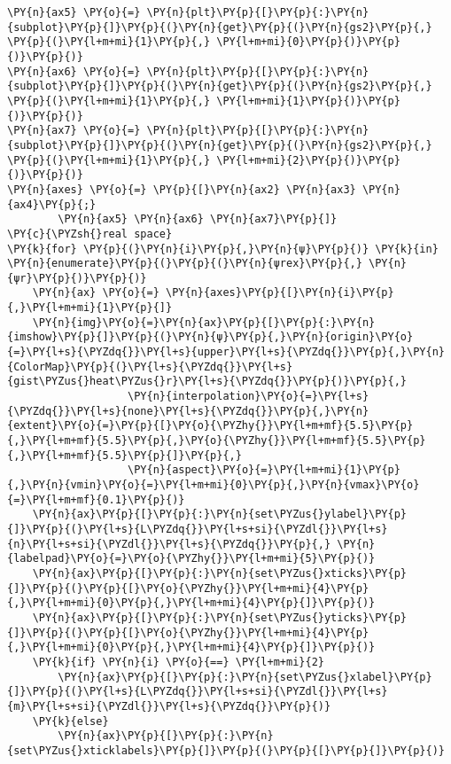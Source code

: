 \begin{Verbatim}[commandchars=\\\{\}]
\PY{n}{ax5} \PY{o}{=} \PY{n}{plt}\PY{p}{[}\PY{p}{:}\PY{n}{subplot}\PY{p}{]}\PY{p}{(}\PY{n}{get}\PY{p}{(}\PY{n}{gs2}\PY{p}{,} \PY{p}{(}\PY{l+m+mi}{1}\PY{p}{,} \PY{l+m+mi}{0}\PY{p}{)}\PY{p}{)}\PY{p}{)}
\PY{n}{ax6} \PY{o}{=} \PY{n}{plt}\PY{p}{[}\PY{p}{:}\PY{n}{subplot}\PY{p}{]}\PY{p}{(}\PY{n}{get}\PY{p}{(}\PY{n}{gs2}\PY{p}{,} \PY{p}{(}\PY{l+m+mi}{1}\PY{p}{,} \PY{l+m+mi}{1}\PY{p}{)}\PY{p}{)}\PY{p}{)}
\PY{n}{ax7} \PY{o}{=} \PY{n}{plt}\PY{p}{[}\PY{p}{:}\PY{n}{subplot}\PY{p}{]}\PY{p}{(}\PY{n}{get}\PY{p}{(}\PY{n}{gs2}\PY{p}{,} \PY{p}{(}\PY{l+m+mi}{1}\PY{p}{,} \PY{l+m+mi}{2}\PY{p}{)}\PY{p}{)}\PY{p}{)}
\PY{n}{axes} \PY{o}{=} \PY{p}{[}\PY{n}{ax2} \PY{n}{ax3} \PY{n}{ax4}\PY{p}{;}
        \PY{n}{ax5} \PY{n}{ax6} \PY{n}{ax7}\PY{p}{]}
\PY{c}{\PYZsh{}real space}
\PY{k}{for} \PY{p}{(}\PY{n}{i}\PY{p}{,}\PY{n}{ψ}\PY{p}{)} \PY{k}{in} \PY{n}{enumerate}\PY{p}{(}\PY{p}{(}\PY{n}{ψrex}\PY{p}{,} \PY{n}{ψr}\PY{p}{)}\PY{p}{)}
    \PY{n}{ax} \PY{o}{=} \PY{n}{axes}\PY{p}{[}\PY{n}{i}\PY{p}{,}\PY{l+m+mi}{1}\PY{p}{]}
    \PY{n}{img}\PY{o}{=}\PY{n}{ax}\PY{p}{[}\PY{p}{:}\PY{n}{imshow}\PY{p}{]}\PY{p}{(}\PY{n}{ψ}\PY{p}{,}\PY{n}{origin}\PY{o}{=}\PY{l+s}{\PYZdq{}}\PY{l+s}{upper}\PY{l+s}{\PYZdq{}}\PY{p}{,}\PY{n}{ColorMap}\PY{p}{(}\PY{l+s}{\PYZdq{}}\PY{l+s}{gist\PYZus{}heat\PYZus{}r}\PY{l+s}{\PYZdq{}}\PY{p}{)}\PY{p}{,}
                   \PY{n}{interpolation}\PY{o}{=}\PY{l+s}{\PYZdq{}}\PY{l+s}{none}\PY{l+s}{\PYZdq{}}\PY{p}{,}\PY{n}{extent}\PY{o}{=}\PY{p}{[}\PY{o}{\PYZhy{}}\PY{l+m+mf}{5.5}\PY{p}{,}\PY{l+m+mf}{5.5}\PY{p}{,}\PY{o}{\PYZhy{}}\PY{l+m+mf}{5.5}\PY{p}{,}\PY{l+m+mf}{5.5}\PY{p}{]}\PY{p}{,}
                   \PY{n}{aspect}\PY{o}{=}\PY{l+m+mi}{1}\PY{p}{,}\PY{n}{vmin}\PY{o}{=}\PY{l+m+mi}{0}\PY{p}{,}\PY{n}{vmax}\PY{o}{=}\PY{l+m+mf}{0.1}\PY{p}{)}
    \PY{n}{ax}\PY{p}{[}\PY{p}{:}\PY{n}{set\PYZus{}ylabel}\PY{p}{]}\PY{p}{(}\PY{l+s}{L\PYZdq{}}\PY{l+s+si}{\PYZdl{}}\PY{l+s}{n}\PY{l+s+si}{\PYZdl{}}\PY{l+s}{\PYZdq{}}\PY{p}{,} \PY{n}{labelpad}\PY{o}{=}\PY{o}{\PYZhy{}}\PY{l+m+mi}{5}\PY{p}{)}
    \PY{n}{ax}\PY{p}{[}\PY{p}{:}\PY{n}{set\PYZus{}xticks}\PY{p}{]}\PY{p}{(}\PY{p}{[}\PY{o}{\PYZhy{}}\PY{l+m+mi}{4}\PY{p}{,}\PY{l+m+mi}{0}\PY{p}{,}\PY{l+m+mi}{4}\PY{p}{]}\PY{p}{)}
    \PY{n}{ax}\PY{p}{[}\PY{p}{:}\PY{n}{set\PYZus{}yticks}\PY{p}{]}\PY{p}{(}\PY{p}{[}\PY{o}{\PYZhy{}}\PY{l+m+mi}{4}\PY{p}{,}\PY{l+m+mi}{0}\PY{p}{,}\PY{l+m+mi}{4}\PY{p}{]}\PY{p}{)}
    \PY{k}{if} \PY{n}{i} \PY{o}{==} \PY{l+m+mi}{2}
        \PY{n}{ax}\PY{p}{[}\PY{p}{:}\PY{n}{set\PYZus{}xlabel}\PY{p}{]}\PY{p}{(}\PY{l+s}{L\PYZdq{}}\PY{l+s+si}{\PYZdl{}}\PY{l+s}{m}\PY{l+s+si}{\PYZdl{}}\PY{l+s}{\PYZdq{}}\PY{p}{)}
    \PY{k}{else}
        \PY{n}{ax}\PY{p}{[}\PY{p}{:}\PY{n}{set\PYZus{}xticklabels}\PY{p}{]}\PY{p}{(}\PY{p}{[}\PY{p}{]}\PY{p}{)}

\end{Verbatim}
